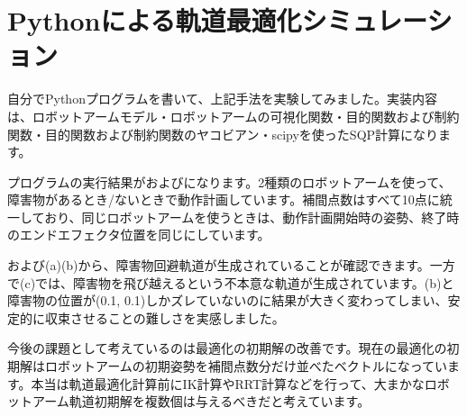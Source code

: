 \clearpage
\section{Pythonによる軌道最適化シミュレーション}
自分でPythonプログラムを書いて、上記手法を実験してみました。実装内容は、ロボットアームモデル・ロボットアームの可視化関数・目的関数および制約関数・目的関数および制約関数のヤコビアン・scipyを使ったSQP計算になります。

プログラムの実行結果がおよびになります。2種類のロボットアームを使って、障害物があるとき/ないときで動作計画しています。補間点数はすべて10点に統一しており、同じロボットアームを使うときは、動作計画開始時の姿勢、終了時のエンドエフェクタ位置を同じにしています。

および(a)(b)から、障害物回避軌道が生成されていることが確認できます。一方で(c)では、障害物を飛び越えるという不本意な軌道が生成されています。(b)と障害物の位置が(0.1, 0.1)しかズレていないのに結果が大きく変わってしまい、安定的に収束させることの難しさを実感しました。

今後の課題として考えているのは最適化の初期解の改善です。現在の最適化の初期解はロボットアームの初期姿勢を補間点数分だけ並べたベクトルになっています。本当は軌道最適化計算前にIK計算やRRT計算などを行って、大まかなロボットアーム軌道初期解を複数個は与えるべきだと考えています。

